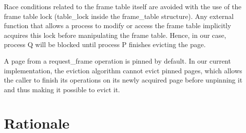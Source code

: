 Race conditions related to the frame table itself are avoided with the use of the frame table lock (table_lock inside the frame_table structure).
Any external function that allows a process to modify or access the frame table implicitly acquires this lock before manipulating the frame table.
Hence, in our case, process Q will be blocked until process P finishes evicting the page.

A page from a request_frame operation is pinned by default.
In our current implementation, the eviction algorithm cannot evict pinned pages, which allows the caller to finish its operations on its newly acquired page before unpinning it and thus making it possible to evict it.


\section{Rationale}

